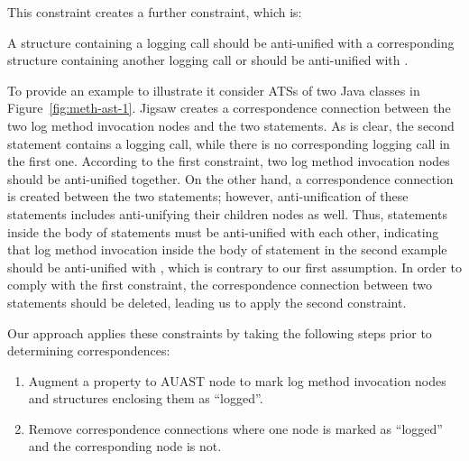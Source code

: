 This constraint creates a further constraint, which is:

\begin{constraint}
A structure containing a logging call should be anti-unified with a corresponding structure containing another logging call or should be anti-unified with \nothing.
\end{constraint}


To provide an example to illustrate it consider ATSs of two Java classes in Figure~\ref{fig:meth-ast-1}. Jigsaw creates a correspondence connection between the two log method invocation nodes and the two  statements. As is clear, the second  statement contains a logging call, while there is no corresponding logging call in the first one. According to the first constraint, two log method invocation nodes should be anti-unified together. On the other hand, a correspondence connection is created between the two  statements; however, anti-unification of these statements includes anti-unifying their children nodes as well. Thus, statements inside the body of  statements must be anti-unified with each other, indicating that log method invocation inside the body of  statement in the second example should be anti-unified with \nothing, which is contrary to our first assumption. In order to comply with the first constraint, the correspondence connection between two  statements should be deleted, leading us to apply the second constraint.

Our approach applies these constraints by taking the following steps prior to determining correspondences:
\begin{enumerate} [leftmargin=.4in]
\item	Augment a property to AUAST node to mark log method invocation nodes and structures enclosing them as ``logged''.

\item	Remove correspondence connections where one node is marked as ``logged'' and the corresponding node is not.
\end{enumerate}


